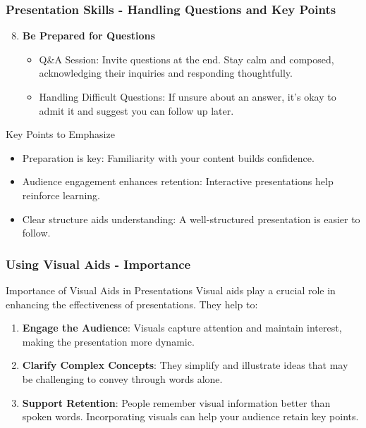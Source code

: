 \documentclass[aspectratio=169]{beamer}
\begin{document}
\begin{frame}[fragile]
    \frametitle{Presentation Skills - Handling Questions and Key Points}
    \begin{enumerate}
        \setcounter{enumi}{7} %
        \item \textbf{Be Prepared for Questions}
            \begin{itemize}
                \item Q\&A Session: Invite questions at the end. Stay calm and composed, acknowledging their inquiries and responding thoughtfully.
                \item Handling Difficult Questions: If unsure about an answer, it’s okay to admit it and suggest you can follow up later.
            \end{itemize}
    \end{enumerate}
    \begin{block}{Key Points to Emphasize}
        \begin{itemize}
            \item Preparation is key: Familiarity with your content builds confidence.
            \item Audience engagement enhances retention: Interactive presentations help reinforce learning.
            \item Clear structure aids understanding: A well-structured presentation is easier to follow.
        \end{itemize}
    \end{block}
\end{frame}

\begin{frame}[fragile]
    \frametitle{Using Visual Aids - Importance}
    \begin{block}{Importance of Visual Aids in Presentations}
        Visual aids play a crucial role in enhancing the effectiveness of presentations. They help to:
    \end{block}
    
    \begin{enumerate}
        \item \textbf{Engage the Audience}: Visuals capture attention and maintain interest, making the presentation more dynamic.
        \item \textbf{Clarify Complex Concepts}: They simplify and illustrate ideas that may be challenging to convey through words alone.
        \item \textbf{Support Retention}: People remember visual information better than spoken words. Incorporating visuals can help your audience retain key points.
    \end{enumerate}
\end{frame}
\end{document}
